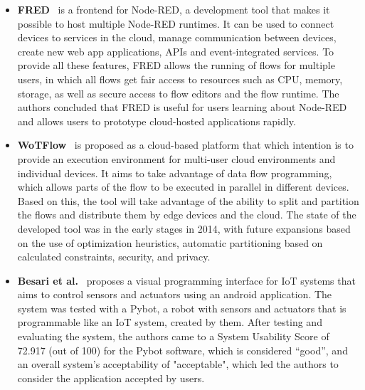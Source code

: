 \begin{itemize}

\item\textbf{FRED}~\cite{fred} is a frontend for Node-RED, a development tool that makes it possible to host multiple Node-RED runtimes. It can be used to connect devices to services in the cloud, manage communication between devices, create new web app applications, APIs and event-integrated services. To provide all these features, FRED allows the running of flows for multiple users, in which all flows get fair access to resources such as CPU, memory, storage, as well as secure access to flow editors and the flow runtime. The authors concluded that FRED is useful for users learning about Node-RED and allows users to prototype cloud-hosted applications rapidly.

\item\textbf{WoTFlow}~\cite{wotflow_dnr} is proposed as a cloud-based platform that which intention is to provide an execution environment for multi-user cloud environments and individual devices. It aims to take advantage of data flow programming, which allows parts of the flow to be executed in parallel in different devices. Based on this, the tool will take advantage of the ability to split and partition the flows and distribute them by edge devices and the cloud. The state of the developed tool was in the early stages in 2014, with future expansions based on the use of optimization heuristics, automatic partitioning based on calculated constraints, security, and privacy.

\item\textbf{Besari et al.}~\cite{mobile_apps_rpi,pre_mobile_apps_rpi} proposes a visual programming interface for IoT systems that aims to control sensors and actuators using an android application. The system was tested with a Pybot, a robot with sensors and actuators that is programmable like an IoT system, created by them. After testing and evaluating the system, the authors came to a System Usability Score of 72.917 (out of 100) for the Pybot software, which is considered ``good'', and an overall system's acceptability of "acceptable", which led the authors to consider the application accepted by users.


\end{itemize}
